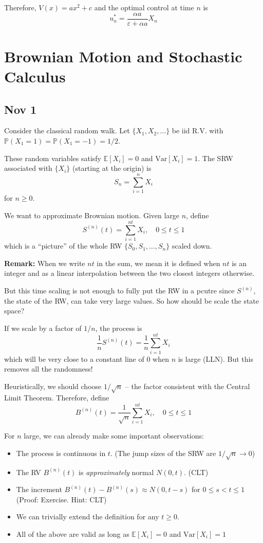 \documentclass[12pt]{report}
\renewcommand{\P}{\mathbb{P}}
\newcommand{\E}{\mathbb{E}}
\newcommand{\ep}{\varepsilon}
\newcommand{\Var}{\text{Var}}
\newcommand*{\tbf}[1]{\ifmmode\mathbf{#1}\else\textbf{#1}\fi}
\begin{document}
    Therefore, $V(x) = ax^2 + c$ and the optimal control at time $n$ is 
    \[u_n^* = \frac{\alpha a}{\ep + \alpha a} X_n\]



\chapter{Brownian Motion and Stochastic Calculus}
\section{Nov 1}
    Consider the classical random walk. Let $\{X_1, X_2, \dots\}$ be iid R.V. with $\P(X_1 = 1) = \P(X_1 = -1) = 1/2$.

    These random variables satisfy $\E[X_i] = 0$ and $\Var[X_i] = 1$. The SRW associated with $\{X_i\}$ (starting at the origin) is 
    \[S_n = \sum_{i=1}^n X_i\]
    for $n\geq 0$.

    We want to approximate Brownian motion. Given large $n$, define 
    \[S^(n)(t) = \sum_{i=1}^{nt} X_i, \quad 0 \leq t \leq 1\] 
    which is a ``picture'' of the whole RW $\{S_0, S_1, \dots, S_n\}$ scaled down. 

    \tbf{Remark:} When we write $nt$ in the sum, we mean it is defined when $nt$ is an integer and as a linear interpolation between the two closest integers otherwise.

    But this time scaling is not enough to fully put the RW in a pcutre since $S^{(n)}$, the state of the RW, can take very large values. So how should be scale the state space?

    If we scale by a factor of $1/n$, the process is 
    \[\frac{1}{n} S^{(n)}(t) = \frac{1}{n}\sum_{i=1}^{nt} X_i\]
    which will be very close to a constant line of $0$ when $n$ is large (LLN). But this removes all the randomness! 

    Heuristically, we should choose $1/\sqrt{n}$ -- the factor consistent with the Central Limit Theorem. Therefore, define
    \[B^{(n)}(t) = \frac{1}{\sqrt n} \sum_{i=1}^{nt} X_i, \quad 0 \leq t \leq 1\]

    For $n$ large, we can already make some important observations:
    \begin{itemize}
        \item The process is continuous in $t$. (The jump sizes of the SRW are $1/\sqrt n \to 0$)
        \item The RV $B^{(n)}(t)$ is \emph{approximately} normal $N(0, t)$. (CLT)
        \item The increment $B^{(n)}(t) - B^{(n)}(s) \approx N(0, t - s)$ for $0 \leq s < t \leq 1$ (Proof: Exercise. Hint: CLT)
        \item We can trivially extend the definition for any $t \geq 0$. 
        \item All of the above are valid as long as $\E[X_i] = 0$ and $\Var[X_i] = 1$ 
    \end{itemize}
\end{document}
